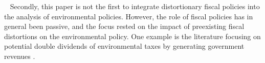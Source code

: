 \
Secondly, this paper is not the first to integrate distortionary fiscal policies into the analysis of environmental policies. However, the role of fiscal policies has in general been passive, and the focus rested on the impact of preexisting fiscal distortions on the environmental policy. One example is the literature focusing on potential double dividends of environmental taxes by generating government revenues \citep[][]{Goulder1995EnvironmentalGuide, Bovenberg2002EnvironmentalRegulation}. 
